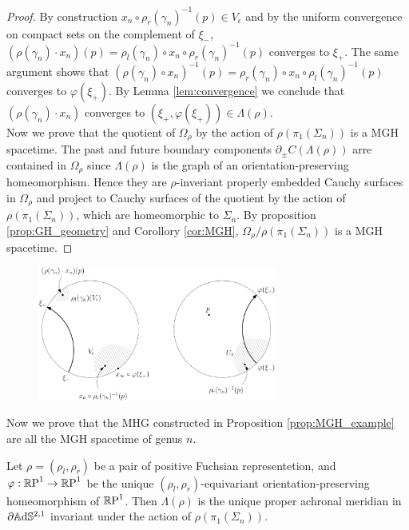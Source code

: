 \begin{proof}
    By construction $x_n \circ \rho_r(\gamma_n)^{-1}(p) \in V_\epsilon$ and by the uniform convergence on compact sets on the complement of $\xi_-$, $(\rho(\gamma_n) \cdot x_n) (p) = \rho_l(\gamma_n)\circ x_n \circ \rho_r(\gamma_n)^{-1}(p)$ converges to $\xi_+$. The same argument shows that $(\rho(\gamma_n) \circ x_n)^{-1}(p) = \rho_r(\gamma_n)\circ x_n \circ \rho_l(\gamma_n)^{-1}(p)$ converges to $\varphi(\xi_+)$. By Lemma \ref{lem:convergence} we conclude that $(\rho(\gamma_n)\cdot x_n)$ converges to $(\xi_+, \varphi(\xi_+)) \in \Lambda(\rho)$.\\
    Now we prove that the quotient of $\Omega_\rho$ by the action of $\rho(\pi_1(\Sigma_n))$ is a MGH spacetime. The past and future boundary components $\partial_\pm C(\Lambda(\rho))$ arre contained in $\Omega_\rho$ since $\Lambda(\rho)$ is the graph of an orientation-preserving homeomorphism. Hence they are $\rho$-inveriant properly embedded Cauchy surfaces in $\Omega_\rho$ and project to Cauchy surfaces of the quotient by the action of $\rho(\pi_1(\Sigma_n))$, which are homeomorphic to $\Sigma_n$. By proposition \ref{prop:GH_geometry} and Corollory \ref{cor:MGH}, $\Omega_\rho / \rho(\pi_1(\Sigma_n))$ is a MGH spacetime.
\end{proof}
\begin{figure}
    \centering
    \includegraphics[width=0.7\textwidth]{dynamics.png}
    \caption{}
\end{figure}
Now we prove that the MHG constructed in Proposition \ref{prop:MGH_example} are all the MGH spacetime of genus $n$.
\begin{lemma}
    Let $\rho=(\rho_l,\rho_r)$ be a pair of positive Fuchsian representetion, and $\varphi :\S \to \S$ be the unique $(\rho_l,\rho_r)$-equivariant orientation-preserving homeomorphism of $\S$. Then $\Lambda(\rho)$ is the unique proper achronal meridian in $\partial \A^{2,1}$ invariant under the action of $\rho(\pi_1(\Sigma_n))$.
\end{lemma}
